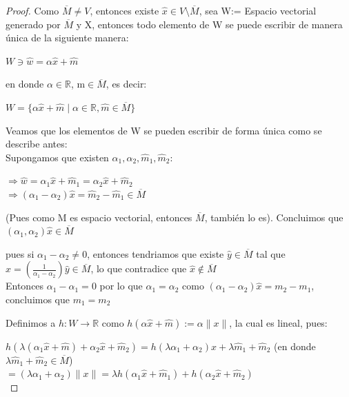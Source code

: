 \documentclass[12pt,a4paper]{book}
\providecommand{\norm}[1]{\lVert#1\rVert}
\providecommand{\conj}[1]{\lbrace#1\rbrace}
\begin{document}
\begin{proof}
Como $\overline{M}\neq V$, entonces existe $\widehat{x}\in V\setminus \overline{M}$, sea W:= Espacio vectorial generado por $\overline{M}$ y X, entonces todo elemento de W se puede escribir de manera única de la siguiente manera:
\begin{center}
$W\ni \widehat{w}=\alpha\widehat{x}+\widehat{m}$  
\end{center} 
en donde $\alpha\in\mathbb{R}$, m$\in\overline{M}$, es decir:

\begin{center}
$W=\conj{\alpha\widehat{x}+\widehat{m}\;|\; \alpha\in\mathbb{R},\widehat{m}\in\overline{M}}$
\end{center}
Veamos que los elementos de W se pueden escribir de forma única como se describe antes:\\

Supongamos que existen $\alpha_{1},\alpha_{2},\widehat{m}_{1},\widehat{m}_{2}$:

$\Rightarrow \widehat{w}=\alpha_{1}\widehat{x}+\widehat{m}_{1}=\alpha_{2}\widehat{x}+\widehat{m}_{2}$
\\
$\Rightarrow (\alpha_{1}-\alpha_{2})\widehat{x}=\widehat{m}_{2}-\widehat{m}_{1}\in \overline{M}$

(Pues como M es espacio vectorial, entonces $\overline{M}$, también lo es). Concluimos que $(\alpha_{1},\alpha_{2})\widehat{x}\in\overline{M}$ 

pues si $\alpha_{1}-\alpha_{2}\neq  0$, entonces tendriamos que existe $\widehat{y}\in\overline{M}$ tal que $\widehat{x}=(\frac{1}{\alpha_{1}-\alpha_{2}})\widehat{y}\in\overline{M}$, lo que contradice que $\widehat{x}\not\in\overline{M}$\\

Entonces $\alpha_{1}-\alpha_{1}=0$ por lo que $\alpha_{1}=\alpha_{2}$ como $(\alpha_{1}-\alpha_{2})\widehat{x}=m_{2}-m_{1}$, concluimos que $m_{1}=m_{2}$

Definimos a $h:W\rightarrow\mathbb{R}$ como $h(\alpha\widehat{x}+\widehat{m}):=\alpha\norm{x}$, la cual es lineal, pues:

$h(\lambda(\alpha_{1}\widehat{x}+\widehat{m})+\alpha_{2}\widehat{x}+\widehat{m}_{2})=h(\lambda\alpha_{1}+\alpha_{2})\widehat{x}+\lambda\widehat{m}_{1}+\widehat{m}_{2}$ (en donde $\lambda\widehat{m}_{1}+\widehat{m}_{2}\in\overline{M}$)\\
$=(\lambda\alpha_{1}+\alpha_{2})\norm{x}=\lambda h(\alpha_{1}\widehat{x}+\widehat{m}_{1})+h(\alpha_{2}\widehat{x}+\widehat{m}_{2})$\\


\end{proof}
\end{document}
